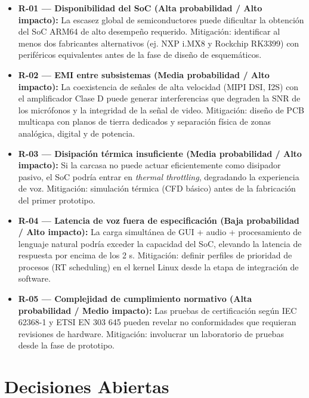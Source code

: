 \documentclass[%
	paper=a4,
	twoside=false,
	parskip=half,
	chapterprefix=false,
	10pt,
	headings=normal,
	bibliography=totoc,
	listof=totoc,
	titlepage=on,
	captions=tableabove,
	draft=false,
]{scrbook}%
\begin{document}
\begin{itemize}
    \item \textbf{R-01 — Disponibilidad del SoC (Alta probabilidad / Alto impacto):} La escasez global de semiconductores puede dificultar la obtención del SoC ARM64 de alto desempeño requerido. Mitigación: identificar al menos dos fabricantes alternativos (ej. NXP i.MX8 y Rockchip RK3399) con periféricos equivalentes antes de la fase de diseño de esquemáticos.
    \item \textbf{R-02 — EMI entre subsistemas (Media probabilidad / Alto impacto):} La coexistencia de señales de alta velocidad (MIPI DSI, I2S) con el amplificador Clase D puede generar interferencias que degraden la SNR de los micrófonos y la integridad de la señal de video. Mitigación: diseño de PCB multicapa con planos de tierra dedicados y separación física de zonas analógica, digital y de potencia.
    \item \textbf{R-03 — Disipación térmica insuficiente (Media probabilidad / Alto impacto):} Si la carcasa no puede actuar eficientemente como disipador pasivo, el SoC podría entrar en \textit{thermal throttling}, degradando la experiencia de voz. Mitigación: simulación térmica (CFD básico) antes de la fabricación del primer prototipo.
    \item \textbf{R-04 — Latencia de voz fuera de especificación (Baja probabilidad / Alto impacto):} La carga simultánea de GUI + audio + procesamiento de lenguaje natural podría exceder la capacidad del SoC, elevando la latencia de respuesta por encima de los 2 s. Mitigación: definir perfiles de prioridad de procesos (RT scheduling) en el kernel Linux desde la etapa de integración de software.
    \item \textbf{R-05 — Complejidad de cumplimiento normativo (Alta probabilidad / Medio impacto):} Las pruebas de certificación según IEC 62368-1 y ETSI EN 303 645 pueden revelar no conformidades que requieran revisiones de hardware. Mitigación: involucrar un laboratorio de pruebas desde la fase de prototipo.
\end{itemize}

\section{Decisiones Abiertas}
\end{document}

